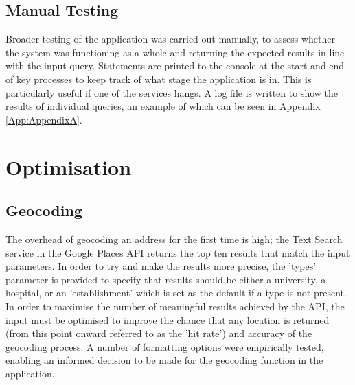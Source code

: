 \documentclass[Report.tex]{subfiles}
\begin{document}
\subsection{Manual Testing}
Broader testing of the application was carried out manually, to assess whether the system was functioning as a whole and returning the expected results in line with the input query. Statements are printed to the console at the start and end of key processes to keep track of what stage the application is in. This is particularly useful if one of the services hangs. A log file is written to show the results of individual queries, an example of which can be seen in Appendix \ref{App:AppendixA}. 

\section{Optimisation}
\subsection{Geocoding}
The overhead of geocoding an address for the first time is high; the Text Search service in the Google Places API returns the top ten results that match the input parameters. In order to try and make the results more precise, the 'types' parameter is provided to specify that results should be either a university, a hospital, or an 'establishment' which is set as the default if a type is not present. In order to maximise the number of meaningful results achieved by the API, the input must be optimised to improve the chance that any location is returned (from this point onward referred to as the 'hit rate') and accuracy of the geocoding process. A number of formatting options were empirically tested, enabling an informed decision to be made for the geocoding function in the application.\newline
\end{document}

